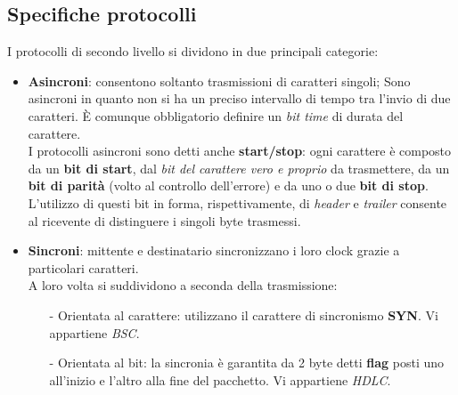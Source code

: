 \documentclass[a4paper,11pt]{article}
\def\italic#1{\textit{#1}}
\begin{document}
\subsection{Specifiche protocolli}
I protocolli di secondo livello si dividono in due principali categorie:
\begin{itemize}
	\item\textbf{Asincroni}: consentono soltanto trasmissioni di caratteri singoli; Sono asincroni in quanto non si ha un preciso intervallo di tempo tra l'invio di due caratteri. È comunque obbligatorio definire un \italic{bit time} di durata del carattere.
	\\I protocolli asincroni sono detti anche \textbf{start/stop}: ogni carattere è composto da un \textbf{bit di start}, dal \textit{bit del carattere vero e proprio} da trasmettere, da un \textbf{bit di parità} (volto al controllo dell'errore) e da uno o due \textbf{bit di stop}.
	\\L'utilizzo di questi bit in forma, rispettivamente, di \textit{header} e \textit{trailer} consente al ricevente di distinguere i singoli byte trasmessi.
	\item\textbf{Sincroni}: mittente e destinatario sincronizzano i loro clock grazie a particolari caratteri.
	\\A loro volta si suddividono a seconda della trasmissione:
	\begin{itemize}
		\item[-]Orientata al carattere: utilizzano il carattere di sincronismo \textbf{SYN}. Vi appartiene \textit{BSC}.
		\item[-]Orientata al bit: la sincronia è garantita da 2 byte detti \textbf{flag} posti uno all'inizio e l'altro alla fine del pacchetto. Vi appartiene \textit{HDLC}.
	\end{itemize}
\end{itemize} 
\end{document}
